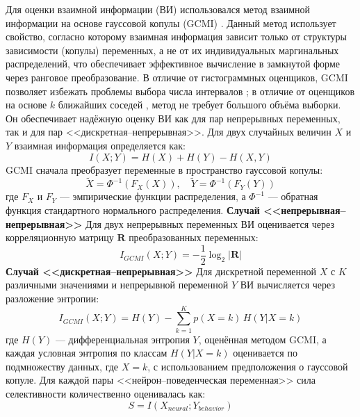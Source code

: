 Для оценки взаимной информации (ВИ) использовался метод взаимной информации на основе гауссовой копулы (GCMI)
\cite{gcmi, ma2011mutual}. Данный метод использует свойство, согласно которому взаимная информация зависит только от структуры зависимости (копулы) переменных, а не от их индивидуальных маргинальных распределений, что обеспечивает эффективное вычисление в замкнутой форме через ранговое преобразование. В отличие от гистограммных оценщиков, GCMI позволяет избежать проблемы выбора числа интервалов \cite{Ross2014}; в отличие от оценщиков на основе $k$ ближайших соседей \cite{Kraskov2004}, метод не требует большого объёма выборки. Он обеспечивает надёжную оценку ВИ как для пар непрерывных переменных, так и для пар <<дискретная--непрерывная>>.
Для двух случайных величин $X$ и $Y$ взаимная информация определяется как:
\begin{equation}
\label{eq:mi_def}
I(X;Y) = H(X) + H(Y) - H(X,Y)
\end{equation}
GCMI сначала преобразует переменные в пространство гауссовой копулы:
\begin{equation}
\label{eq:gcmi_transform}
\tilde{X} = \Phi^{-1}(F_X(X)), \quad \tilde{Y} = \Phi^{-1}(F_Y(Y))
\end{equation}
где $F_X$ и $F_Y$ --- эмпирические функции распределения, а
$\Phi^{-1}$ --- обратная функция стандартного нормального распределения.
\textbf{Случай <<непрерывная--непрерывная>>}
Для двух непрерывных переменных ВИ оценивается через корреляционную матрицу
$\mathbf{R}$ преобразованных переменных:
\begin{equation}
\label{eq:gcmi_continuous}
I_{GCMI}(X;Y) = -\frac{1}{2}\log_2|\mathbf{R}|
\end{equation}
\textbf{Случай <<дискретная--непрерывная>>}
Для дискретной переменной $X$ с $K$ различными значениями и непрерывной переменной $Y$
ВИ вычисляется через разложение энтропии:
\begin{equation}
\label{eq:gcmi_discrete}
I_{GCMI}(X;Y) = H(Y) - \sum_{k=1}^{K} p(X=k) \, H(Y | X=k)
\end{equation}
где $H(Y)$ --- дифференциальная энтропия $Y$, оценённая методом GCMI, а каждая условная энтропия по классам $H(Y|X=k)$ оценивается по подмножеству данных, где
$X = k$, с использованием предположения о гауссовой копуле.
Для каждой пары <<нейрон--поведенческая переменная>> сила селективности количественно оценивалась как:
\begin{equation}
\label{eq:selectivity_strength}
S = I(X_{neural}; Y_{behavior})
\end{equation}


